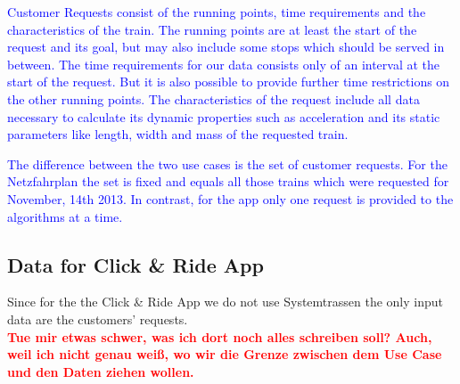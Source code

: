 \textcolor{blue}{Customer Requests consist of the running points, time requirements and the characteristics of the train. The running points are at least the start of the request and its goal, but may also include some stops which should be served in between. The time requirements for our data consists only of an interval at the start of the request. But it is also possible to provide further time restrictions on the other running points. The characteristics of the request include all data necessary to calculate its dynamic properties such as acceleration and its static parameters like length, width and mass of the requested train.}

\textcolor{blue}{The difference between the two use cases is the set of customer requests. For the Netzfahrplan the set is fixed and equals all those trains which were requested for November, 14th 2013. In contrast, for the app only one request is provided to the algorithms at a time.}


\subsection{Data for Click \& Ride App}
\label{chap:dataCnR}
Since for the the Click \& Ride App we do not use Systemtrassen the only input data are the customers' requests. 
\\
\textbf{\textcolor{red}{Tue mir etwas schwer, was ich dort noch alles schreiben soll? Auch, weil ich nicht genau weiß, wo wir die Grenze zwischen dem Use Case und den Daten ziehen wollen.}}